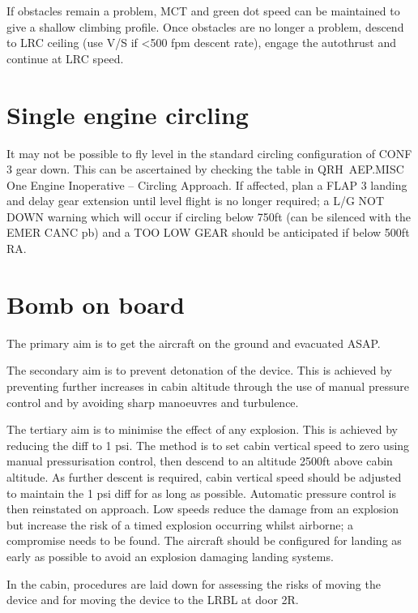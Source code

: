 \documentclass[a5paper,11pt,twoside]{book}
\newcommand{\inlcite}[1]{{\footnotesize\scshape\MakeLowercase{[#1]}}}
\newcommand{\multicite}[1]{%

  \nopagebreak
  \noindent{{\color{blue}\inlcite{#1}}}
}
\begin{document}
If obstacles remain a problem, MCT and green dot speed can be maintained to give
a shallow climbing profile. Once obstacles are no longer a problem, descend to
LRC ceiling (use V/S if <500 fpm descent rate), engage the autothrust and
continue at LRC speed.

\multicite{FCTM~PRO.AEP.ENG.EFDC}
\section{Single engine circling}

It may not be possible to fly level in the standard circling configuration of
CONF 3 gear down. This can be ascertained by checking the table in QRH~AEP.MISC
One Engine Inoperative – Circling Approach. If affected, plan a FLAP 3 landing
and delay gear extension until level flight is no longer required; a L/G NOT
DOWN warning which will occur if circling below 750ft (can be silenced with the
EMER CANC pb) and a TOO LOW GEAR should be anticipated if below 500ft RA.

\multicite{QRH~AEP.MISC}

\section{Bomb on board}

The primary aim is to get the aircraft on the ground and evacuated ASAP.

The secondary aim is to prevent detonation of the device. This is achieved by
preventing further increases in cabin altitude through the use of manual
pressure control and by avoiding sharp manoeuvres and turbulence.

The tertiary aim is to minimise the effect of any explosion. This is achieved by
reducing the diff to 1 psi. The method is to set cabin vertical speed to zero
using manual pressurisation control, then descend to an altitude 2500ft above
cabin altitude. As further descent is required, cabin vertical speed should be
adjusted to maintain the 1 psi diff for as long as possible. Automatic pressure
control is then reinstated on approach. Low speeds reduce the damage from an
explosion but increase the risk of a timed explosion occurring whilst airborne;
a compromise needs to be found. The aircraft should be configured for landing as
early as possible to avoid an explosion damaging landing systems.

In the cabin, procedures are laid down for assessing the risks of moving the
device and for moving the device to the LRBL at door 2R.
\end{document}
